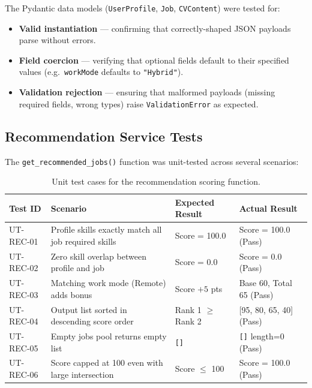 \documentclass[12pt, a4paper, oneside]{report}
\begin{document}
The Pydantic data models (\texttt{UserProfile}, \texttt{Job}, \texttt{CVContent}) were
tested for:
\begin{itemize}[itemsep=3pt]
  \item \textbf{Valid instantiation} — confirming that correctly-shaped JSON payloads parse
        without errors.
  \item \textbf{Field coercion} — verifying that optional fields default to their specified
        values (e.g.\ \texttt{workMode} defaults to \texttt{"Hybrid"}).
  \item \textbf{Validation rejection} — ensuring that malformed payloads (missing required
        fields, wrong types) raise \texttt{ValidationError} as expected.
\end{itemize}

\subsection*{Recommendation Service Tests}

The \texttt{get\_recommended\_jobs()} function was unit-tested across several scenarios:

\begin{table}[H]
  \centering
  \caption{Unit test cases for the recommendation scoring function.}
  \label{tab:unit-recommendation}
  \renewcommand{\arraystretch}{1.3}
  \begin{tabularx}{\textwidth}{@{} l X X X @{}}
    \toprule
    \textbf{Test ID} & \textbf{Scenario} & \textbf{Expected Result} & \textbf{Actual Result} \\
    \midrule
    UT-REC-01 & Profile skills exactly match all job required skills & Score = 100.0 & Score = 100.0 (Pass) \\
    UT-REC-02 & Zero skill overlap between profile and job & Score = 0.0 & Score = 0.0 (Pass) \\
    UT-REC-03 & Matching work mode (Remote) adds bonus & Score $+5$ pts & Base 60, Total 65 (Pass) \\
    UT-REC-04 & Output list sorted in descending score order & Rank 1 $\geq$ Rank 2 & [95, 80, 65, 40] (Pass) \\
    UT-REC-05 & Empty jobs pool returns empty list & \texttt{[]} & \texttt{[]} length=0 (Pass) \\
    UT-REC-06 & Score capped at 100 even with large intersection & Score $\leq$ 100 & Score = 100.0 (Pass) \\
    \bottomrule
  \end{tabularx}
\end{table}
\end{document}
